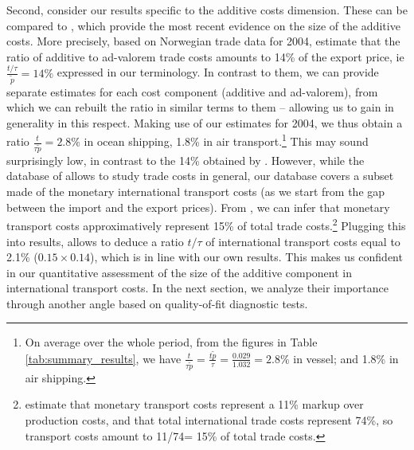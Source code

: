 \documentclass[a4paper,11pt]{article}
\begin{document}
Second, consider our results specific to the additive costs dimension. These can be compared to \citet{Irrazabal_2015}, which provide the most recent evidence on the size of the additive costs. More precisely, based on Norwegian trade data for 2004, \citet{Irrazabal_2015} estimate that the ratio of additive to ad-valorem trade costs amounts to 14\% of the export price, ie $\frac{t/\tau}{\widetilde{p}}=14\%$ expressed in our terminology. In contrast to them, we can provide separate estimates for each cost component (additive and ad-valorem), from which we can rebuilt the ratio in similar terms to them -- allowing us to gain in generality in this respect. Making use of our estimates for 2004, we thus obtain a ratio $\frac{t}{\tau\widetilde{p}}=2.8\%$ in ocean shipping, 1.8\% in air transport.\footnote{On average over the whole period, from the figures in Table \ref{tab:summary_results}, we have $\frac{t}{\tau\widetilde{p}}= \frac{t\widetilde{p}}{\tau} = \frac{0.029}{1.032}= 2.8\%$ in vessel; and 1.8\% in air shipping. } This may sound surprisingly low, in contrast to the 14\% obtained by \citet{Irrazabal_2015}. However, while the database of \citet{Irrazabal_2015} allows to study trade costs in general, our database covers a subset made of the monetary international transport costs (as we start from the gap between the import and the export prices). From \citet{anderson_wincoop_jel}, we can infer that monetary transport costs approximatively represent 15\% of total trade costs.\footnote{\citet{anderson_wincoop_jel} estimate that monetary transport costs represent a 11\% markup over production costs, and that total international trade costs represent 74\%, so transport costs amount to 11/74= 15\% of total trade costs.} Plugging this into \citet{Irrazabal_2015} results, allows to deduce a ratio $t/\tau$ of international transport costs equal to 2.1\% ($0.15\times 0.14$), which is in line with our own results. This makes us confident in our quantitative assessment of the size of the additive component in international transport costs. In the next section, we analyze their importance through another angle based on quality-of-fit diagnostic tests.
\bigskip




\end{document}
